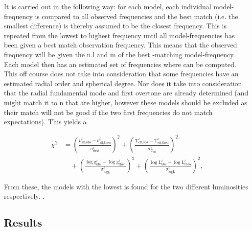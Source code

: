 It is carried out in the following way: for each model, each individual model-frequency is compared to all observed frequencies and the best match (i.e. the smallest difference) is thereby assumed to be the closest frequency. This is repeated from the lowest to highest frequency until all model-frequencies has been given a best match observation frequency. This means that the observed frequency will be given the n.l and m of the best -matching model-frequency. Each model then has an estimated set of frequencies where \chis can be computed. This off course does not take into consideration that some frequencies have an estimated radial order and spherical degree. Nor does it take into consideration that the radial fundamental mode and first overtone are already determined (and might match it to n that are higher, however these models should be excluded as their match will not be good if the two first frequencies do not match expectations). This yields a \chis 

\begin{align}
\chi^2 &= \left(\frac{\nu_{\text{all,obs}}^i-\nu^i_{\text{all,theo}}}{\sigma^i_{\text{first}}}\right)^2
 +
         \left(\frac{\text{T}_\text{eff,obs}^i-\text{T}_\text{eff,theo}^i}{\sigma^i_{\text{T}_\text{eff}}}\right)^2  \nonumber \\
  & \quad +
\left(\frac{\log \text{g}_\text{obs}^i-\log \text{g}_\text{theo}^i}{\sigma^i_{\log \text{g}}}\right)^2  + \left(\frac{\log \text{L}_\text{obs}^i-\log \text{L}_\text{theo}^i}{\sigma^i_{\log \text{L}}}\right)^2, 
 \label{eq:chis_all}
\end{align}

From these, the models with the lowest \chis is found for the two different luminosities respectively. . 

\subsection{Results}

\begin{figure}[htbp]
	\centering
	\caption{}
	\label{hrd44taulenz}
\end{figure}

